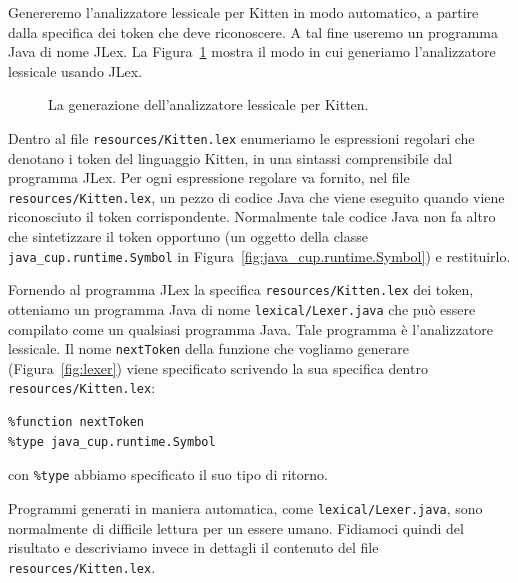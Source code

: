 Genereremo l'analizzatore lessicale per Kitten in modo automatico, a partire
dalla specifica dei token che deve riconoscere. A tal fine useremo un
programma Java di nome JLex. La Figura~\ref{fig:jlex} mostra il
modo in cui generiamo l'analizzatore lessicale usando JLex.
%
\begin{figure}
\begin{center}
\end{center}
\caption{La generazione dell'analizzatore lessicale per Kitten.}
  \label{fig:jlex}
\end{figure}
%
Dentro al file \texttt{resources/Kitten.lex} enumeriamo
le espressioni regolari che denotano i token del linguaggio
Kitten, in una sintassi comprensibile dal programma JLex.
Per ogni espressione regolare va fornito, nel file
\texttt{resources/Kitten.lex}, un pezzo di codice
Java che viene eseguito quando viene riconosciuto il token corrispondente.
Normalmente tale codice Java non fa altro
che sintetizzare il token opportuno (\cioe un oggetto della classe
\texttt{java\_cup.runtime.Symbol} in Figura~\ref{fig:java_cup.runtime.Symbol})
e restituirlo.

Fornendo al programma JLex la specifica
\texttt{resources/Kitten.lex} dei token, otteniamo un programma Java
di nome \texttt{lexical/Lexer.java} che pu\`o essere compilato
come un qualsiasi programma Java. Tale programma \`e l'analizzatore
lessicale. Il nome \texttt{nextToken} della funzione che vogliamo generare
(Figura~\ref{fig:lexer}) viene specificato scrivendo la sua specifica dentro
\texttt{resources/Kitten.lex}:
%
\begin{verbatim}
%function nextToken
%type java_cup.runtime.Symbol
\end{verbatim}
%
con \texttt{\%type} abbiamo specificato il suo tipo di ritorno.

Programmi generati in maniera automatica, come \texttt{lexical/Lexer.java},
sono normalmente di difficile lettura per un essere umano.
Fidiamoci quindi del risultato e descriviamo invece in \piu dettagli
il contenuto del file \texttt{resources/Kitten.lex}.
%
